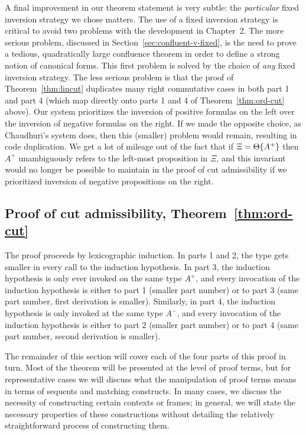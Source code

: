 A final improvement in our theorem statement is very subtle: the {\it
  particular} fixed inversion strategy we chose matters.  The use of a
fixed inversion strategy is critical to avoid two problems with the
development in Chapter~2. The more serious problem, discussed in
Section~\ref{sec:confluent-v-fixed}, is the need to prove a tedious,
quadratically large confluence theorem in order to define a strong
notion of canonical forms. This first problem is solved by the choice
of {\it any} fixed inversion strategy. The less serious problem is
that the proof of Theorem~\ref{thm:lincut} duplicates many right
commutative cases in both part 1 and part 4 (which map directly onto
parts 1 and 4 of Theorem~\ref{thm:ord-cut} above). Our system
prioritizes the inversion of positive formulas on the left over the
inversion of negative formulas on the right. If we made the opposite
choice, as Chaudhuri's system does, then this (smaller) problem 
would remain, resulting in code duplication. 
We get a lot of mileage out of the
fact that if $\Xi = {\Theta}\{{A^+}\}$ then $A^+$ unambiguously
refers to the left-most proposition in $\Xi$, and this invariant would
no longer be possible to maintain in the proof of cut
admissibility if we prioritized inversion of negative propositions on
the right.


\subsection{Proof of cut admissibility, Theorem~\ref{thm:ord-cut}}

The proof proceeds by lexicographic induction.  In parts 1 and 2, the
type gets smaller in every call to the induction hypothesis. In part
3, the induction hypothesis is only ever invoked on the same type
$A^+$, and every invocation of the induction hypothesis is either to
part 1 (smaller part number) or to part 3 (same part number, first
derivation is smaller). Similarly, in part 4, the induction hypothesis
is only invoked at the same type $A^-$, and every invocation of the
induction hypothesis is either to part 2 (smaller part number) or to
part 4 (same part number, second derivation is smaller).

The remainder of this section will cover each of the four parts of
this proof in turn. Most of the theorem will be presented at the level
of proof terms, but for representative cases we will discuss what the
manipulation of proof terms means in terms of sequents and matching
constructs. In many cases, we discuss the necessity of constructing
certain contexts or frames; in general, we will state the necessary
properties of these constructions without detailing the relatively
straightforward process of constructing them.

